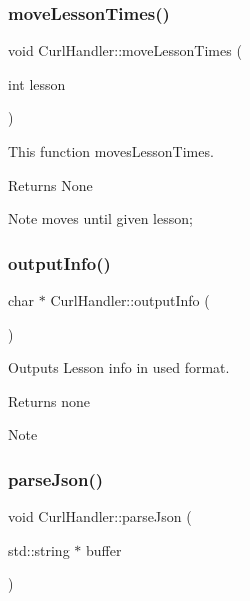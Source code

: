 \subsubsection{\texorpdfstring{move\+Lesson\+Times()}{moveLessonTimes()}}
{\footnotesize\ttfamily void Curl\+Handler\+::move\+Lesson\+Times (\begin{DoxyParamCaption}\item[{int}]{lesson }\end{DoxyParamCaption})}



This function moves\+Lesson\+Times. 

\begin{DoxyReturn}{Returns}
None 
\end{DoxyReturn}
\begin{DoxyNote}{Note}
moves until given lesson; 
\end{DoxyNote}
\mbox{\label{classCurlHandler_a5d840e40c7e2d11297514947e957d542}} 
\subsubsection{\texorpdfstring{output\+Info()}{outputInfo()}}
{\footnotesize\ttfamily char $\ast$ Curl\+Handler\+::output\+Info (\begin{DoxyParamCaption}{ }\end{DoxyParamCaption})}



Outputs Lesson info in used format. 

\begin{DoxyReturn}{Returns}
none 
\end{DoxyReturn}
\begin{DoxyNote}{Note}

\end{DoxyNote}
\mbox{\label{classCurlHandler_a2e63afaaf3fd64263505f90821f02d05}} 
\subsubsection{\texorpdfstring{parse\+Json()}{parseJson()}}
{\footnotesize\ttfamily void Curl\+Handler\+::parse\+Json (\begin{DoxyParamCaption}\item[{std\+::string $\ast$}]{buffer }\end{DoxyParamCaption})}



